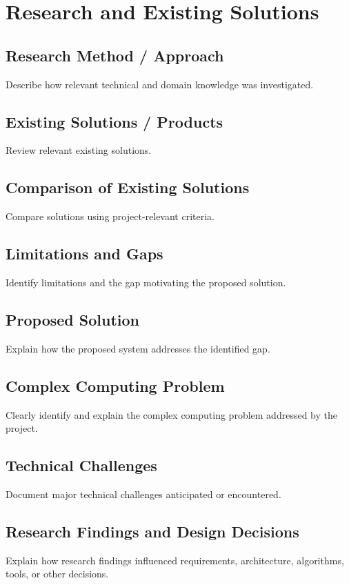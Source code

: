 \chapter{Research and Existing Solutions}
\section{Research Method / Approach}
Describe how relevant technical and domain knowledge was investigated.
\section{Existing Solutions / Products}
Review relevant existing solutions.
\section{Comparison of Existing Solutions}
Compare solutions using project-relevant criteria.
\section{Limitations and Gaps}
Identify limitations and the gap motivating the proposed solution.
\section{Proposed Solution}
Explain how the proposed system addresses the identified gap.
\section{Complex Computing Problem}
Clearly identify and explain the complex computing problem addressed by the project.
\section{Technical Challenges}
Document major technical challenges anticipated or encountered.
\section{Research Findings and Design Decisions}
Explain how research findings influenced requirements, architecture, algorithms, tools, or other decisions.
